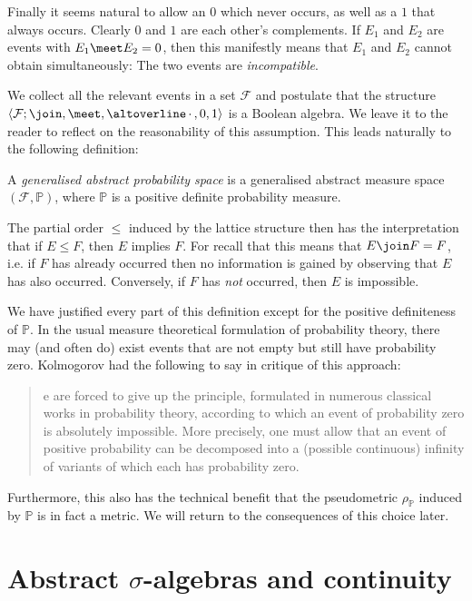 \documentclass[article, a4paper, 11pt, oneside]{memoir}
\numberwithin{equation}{chapter}
\newcommand{\calF}{\mathcal{F}}
\renewcommand{\P}{\mathbb{P}}
\begin{document}
Finally it seems natural to allow an  $0$ which never occurs, as well as a  $1$ that always occurs. Clearly $0$ and $1$ are each other's complements. If $E_1$ and $E_2$ are events with $E_1 \meet E_2 = 0$, then this manifestly means that $E_1$ and $E_2$ cannot obtain simultaneously: The two events are \emph{incompatible}.

We collect all the relevant events in a set $\calF$ and postulate that the structure $\langle \calF; \join, \meet, \compl{\,\cdot\,\vphantom{e}}, 0, 1 \rangle$ is a Boolean algebra. We leave it to the reader to reflect on the reasonability of this assumption. This leads naturally to the following definition:

\begin{definition}
    A \emph{generalised abstract probability space} is a generalised abstract measure space $(\calF, \P)$, where $\P$ is a positive definite probability measure.
\end{definition}
%
The partial order $\leq$ induced by the lattice structure then has the interpretation that if $E \leq F$, then $E$ implies $F$. For recall that this means that $E \join F = F$, i.e. if $F$ has already occurred then no information is gained by observing that $E$ has also occurred. Conversely, if $F$ has \emph{not} occurred, then $E$ is impossible.

We have justified every part of this definition except for the positive definiteness of $\P$. In the usual measure theoretical formulation of probability theory, there may (and often do) exist events that are not empty but still have probability zero. Kolmogorov had the following to say in critique of this approach:
%
\blockquote[\cite{kolmogorov1995}]{%
    e are forced to give up the principle, formulated in numerous classical works in probability theory, according to which an event of probability zero is absolutely impossible. More precisely, one must allow that an event of positive probability can be decomposed into a (possible continuous) infinity of variants of which each has probability
    zero.%
}
%
Furthermore, this also has the technical benefit that the pseudometric $\rho_\P$ induced by $\P$ is in fact a metric. We will return to the consequences of this choice later.


\section[Abstract sigma-algebras and continuity][Abstract $\sigma$-algebras and continuity]{Abstract $\sigma$-algebras and continuity}
\end{document}
